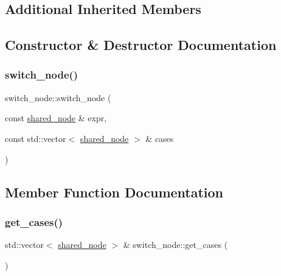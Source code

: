 \subsection*{Additional Inherited Members}


\subsection{Constructor \& Destructor Documentation}
\mbox{\label{classjawe_1_1switch__node_a0698f6b33b788051e38d4abb6c044f48}} 
\subsubsection{\texorpdfstring{switch\+\_\+node()}{switch\_node()}}
{\footnotesize\ttfamily switch\+\_\+node\+::switch\+\_\+node (\begin{DoxyParamCaption}\item[{const \hyperlink{namespacejawe_a3f307481d921b6cbb50cc8511fc2b544}{shared\+\_\+node} \&}]{expr,  }\item[{const std\+::vector$<$ \hyperlink{namespacejawe_a3f307481d921b6cbb50cc8511fc2b544}{shared\+\_\+node} $>$ \&}]{cases }\end{DoxyParamCaption})}



\subsection{Member Function Documentation}
\mbox{\label{classjawe_1_1switch__node_aeef348f7129e56df25575241e66c98d7}} 
\subsubsection{\texorpdfstring{get\+\_\+cases()}{get\_cases()}}
{\footnotesize\ttfamily std\+::vector$<$ \hyperlink{namespacejawe_a3f307481d921b6cbb50cc8511fc2b544}{shared\+\_\+node} $>$ \& switch\+\_\+node\+::get\+\_\+cases (\begin{DoxyParamCaption}{ }\end{DoxyParamCaption})}

